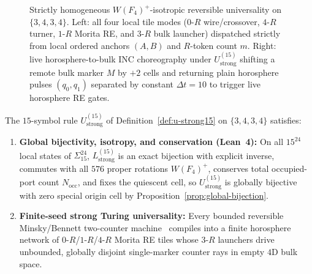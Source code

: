 \begin{figure}[tb]
\caption{Strictly homogeneous $W(F_4)^+$-isotropic reversible universality on $\{3,4,3,4\}$. Left: all four local tile modes ($0$-$R$ wire/crossover, $4$-$R$ turner, $1$-$R$ Morita RE, and $3$-$R$ bulk launcher) dispatched strictly from local ordered anchors $(A,B)$ and $R$-token count $m$. Right: live horosphere-to-bulk $\mathrm{INC}$ choreography under $U_{\mathrm{strong}}^{(15)}$ shifting a remote bulk marker $M$ by $+2$ cells and returning plain horosphere pulses $(q_0, q_1)$ separated by constant $\Delta t = 10$ to trigger live horosphere RE gates.}
\label{fig:spacetime}
\end{figure}

\begin{theorem}
\label{thm:homog-strong-univ}
The $15$-symbol rule $U_{\mathrm{strong}}^{(15)}$ of Definition~\ref{def:u-strong15} on $\{3,4,3,4\}$ satisfies:
\begin{enumerate}
\item \textbf{Global bijectivity, isotropy, and conservation (Lean~4):} On all $15^{24}$ local states of $\Sigma_{15}^{24}$, $L_{\mathrm{strong}}^{(15)}$ is an exact bijection with explicit inverse, commutes with all $576$ proper rotations $W(F_4)^+$, conserves total occupied-port count $N_{\mathrm{occ}}$, and fixes the quiescent cell, so $U_{\mathrm{strong}}^{(15)}$ is globally bijective with zero special origin cell by Proposition~\ref{prop:global-bijection}.
\item \textbf{Finite-seed strong Turing universality:} Every bounded reversible Minsky/Bennett two-counter machine~\cite{minsky1961,bennett1973,morita2017book} compiles into a finite horosphere network of $0$-$R$/$1$-$R$/$4$-$R$ Morita RE tiles whose $3$-$R$ launchers drive unbounded, globally disjoint single-marker counter rays in empty $4\mathrm{D}$ bulk space.
\end{enumerate}
\end{theorem}

